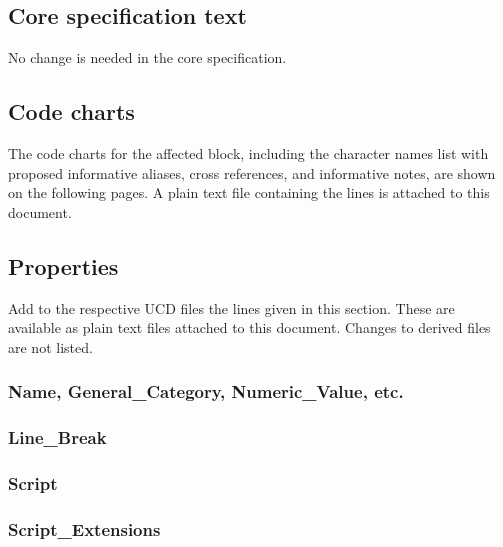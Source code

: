 \documentclass[10pt, a4paper, twoside]{article}
\begin{document}
\subsection{Core specification text}

No change is needed in the core specification.
\subsection{Code charts}
The code charts for the affected block,
including the character names list with proposed informative aliases, cross references, and informative notes,
are shown on the following pages.
A plain text file containing the
 lines is
attached to this document.
%
\subsection{Properties}
\label{properties}
Add to the respective UCD files the lines given in this section.
These are available as plain text files attached to this document.
Changes to derived files are not listed.
\subsubsection{Name, General\_Category, Numeric\_Value, etc.}
\subsubsection{Line\_Break}
\subsubsection{Script}
\subsubsection{Script\_Extensions}
\end{document}
